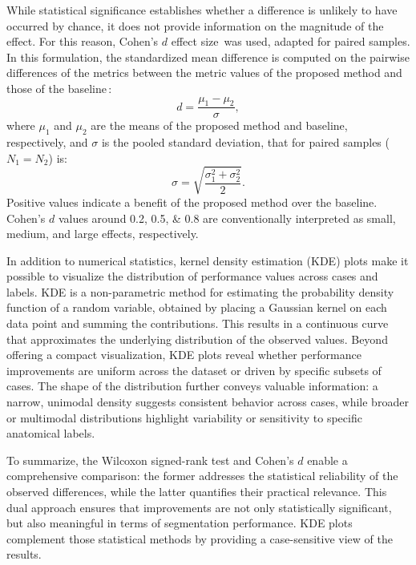 While statistical significance establishes whether a difference is unlikely to have occurred by chance, it does not provide information on the magnitude of the effect. For this reason, Cohen's $d$ effect size\,\cite{Cohen2013} was used, adapted for paired samples. In this formulation, the standardized mean difference is computed on the pairwise differences of the metrics between the metric values of the proposed method and those of the baseline\,\cite{effect_size}:
\begin{equation}
    d = \frac{\mu_1-\mu_2}{\sigma},
\end{equation}
where $\mu_1$ and $\mu_2$ are the means of the proposed method and baseline, respectively, and $\sigma$ is the pooled standard deviation, that for paired samples ($N_1 = N_2$) is:
\begin{equation}
    \sigma = \sqrt{\frac{\sigma_1^2+\sigma_2^2}{2}}.
\end{equation}
Positive values indicate a benefit of the proposed method over the baseline. Cohen's $d$ values around \numlist{0.2; 0.5; 0.8} are conventionally interpreted as small, medium, and large effects, respectively.

In addition to numerical statistics, kernel density estimation (KDE) plots make it possible to visualize the distribution of performance values across cases and labels. KDE is a non-parametric method for estimating the probability density function of a random variable, obtained by placing a Gaussian kernel on each data point and summing the contributions. This results in a continuous curve that approximates the underlying distribution of the observed values. Beyond offering a compact visualization, KDE plots reveal whether performance improvements are uniform across the dataset or driven by specific subsets of cases. The shape of the distribution further conveys valuable information: a narrow, unimodal density suggests consistent behavior across cases, while broader or multimodal distributions highlight variability or sensitivity to specific anatomical labels.

To summarize, the Wilcoxon signed-rank test and Cohen's $d$ enable a comprehensive comparison: the former addresses the statistical reliability of the observed differences, while the latter quantifies their practical relevance. This dual approach ensures that improvements are not only statistically significant, but also meaningful in terms of segmentation performance. KDE plots complement those statistical methods by providing a case-sensitive view of the results.
